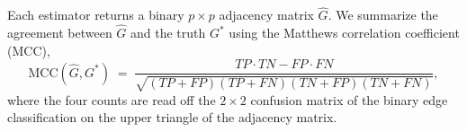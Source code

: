 Each estimator returns a binary $p \times p$ adjacency matrix $\hat G$. We summarize the agreement between $\hat G$ and the truth $G^*$ using the Matthews correlation coefficient (MCC),
\begin{equation}
    \text{MCC}(\hat G, G^*) \;=\;
        \frac{TP \cdot TN - FP \cdot FN}
             {\sqrt{(TP+FP)(TP+FN)(TN+FP)(TN+FN)}},
\end{equation}
where the four counts are read off the $2 \times 2$ confusion matrix of the binary edge classification on the upper triangle of the adjacency matrix. %




